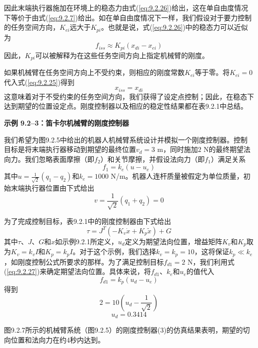 \documentclass[12pt,a4paper]{ctexart}
\begin{document}
因此末端执行器施加在环境上的稳态力由式(\ref{eq:9.2.26})给出，这在单自由度情况下等价于由式(\ref{eq:9.2.7})给出。如在单自由度情况下一样，我们假设对于要力控制的任务空间方向，$K_{ei}$远大于$K_{pi}$。也就是说，式(\ref{eq:9.2.26})中的稳态力可以近似为
\begin{equation}\label{eq:9.2.27}
f_{iss} \approx K_{pi}(x_{di} - x_{ei})
\end{equation}
因此，$K_{pi}$可以被解释为在这些任务空间方向上指定机械臂的刚度。

如果机械臂在任务空间方向上不受约束，则相应的刚度常数$K_{ei}$等于零。将$K_{ei} = 0$代入式(\ref{eq:9.2.25})得到
\begin{equation}\label{eq:9.2.28}
x_{iss} = x_{di}
\end{equation}
这意味着对于不受约束的任务空间方向，我们获得了设定点控制；因此，在稳态下达到期望的位置设定点。刚度控制器以及相应的稳定性结果都在表9.2.1中总结。

\textbf{示例 9.2--3：笛卡尔机械臂的刚度控制器}

我们希望为图9.2.5中给出的机器人机械臂系统设计并模拟一个刚度控制器。控制目标是将末端执行器移动到期望的最终位置$v_d = 3$ m，同时施加$2$ N的最终期望法向力。我们忽略表面摩擦（即$f_2$）和关节摩擦，并假设法向力（即$f_1$）满足关系
\begin{equation}
f_1 = k_e(u - u_e)
\end{equation}
其中$u = \frac{1}{\sqrt{2}}(q_1 - q_2)$和$k_e = 1000$ N/m。机器人连杆质量被假定为单位质量，初始末端执行器位置由下式给出
\begin{equation}
v = \frac{1}{\sqrt{2}}(q_1 + q_2) = 0
\end{equation}

为了完成控制目标，表9.2.1中的刚度控制器由下式给出
\begin{equation}
\tau = J^T(-K_v\dot{x} + K_p\tilde{x}) + G
\end{equation}
其中$\tau$、$J$、$G$和$x$如示例9.2.1所定义，$u_d$定义为期望法向位置，增益矩阵$K_v$和$K_p$取为$K_v = k_v I$和$K_p = k_p I$。对于这个示例，我们选择$k_v = k_p = 10$，这将保证$k_p \ll k_e$，如刚度控制公式所要求的那样。为了满足控制目标$f_{d1} = 2$ N，我们利用式(\ref{eq:9.2.27})来确定期望法向位置。具体来说，将$f_{d1}$、$k_e$和$u_e$的值代入
\begin{equation}
f_{d1} = k_p(u_d - u_e)
\end{equation}
得到
\[
2 = 10(u_d - \frac{1}{\sqrt{2}})
\]
\[
u_d = 0.3414\]  

图9.2.7所示的机械臂系统（图9.2.5）的刚度控制器(3)的仿真结果表明，期望的切向位置和法向力在约4秒内达到。
\end{document}
